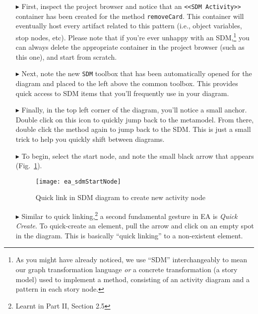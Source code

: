 \begin{itemize}
\item[$\blacktriangleright$] First, inspect the project browser and notice that an \texttt{<<SDM Activity>>} container has been created for the method
\texttt{removeCard}. This container will eventually host every artifact related to this pattern (i.e., object variables, stop nodes, etc). Please note
that if you're ever unhappy with an SDM,\footnote{As you might have already noticed, we use ``SDM'' interchangeably to mean our graph transformation
language \emph{or} a concrete transformation (a story model) used to implement a method, consisting of an activity diagram and a pattern in each story
node.} you can always delete the appropriate container in the project browser (such as this one), and start from scratch.

\item[$\blacktriangleright$] Next, note the new \texttt{SDM} toolbox that has been automatically opened for the diagram and placed to the left above
the common toolbox. This provides quick access to SDM items that you'll frequently use in your diagram.

\item[$\blacktriangleright$] Finally, in the top left corner of the diagram, you'll notice a small anchor. Double click on this icon to quickly jump back to the
metamodel. From there, double click the method again to jump back to the SDM. This is just a small trick to help you quickly shift between diagrams.

\newpage

\item[$\blacktriangleright$] To begin, select the start node, and note the small black arrow that appears (Fig.~\ref{fig:sdm_quicklink}). 

\begin{figure}[htp]
\begin{center}
  \texttt{[image: ea\_sdmStartNode]}
  \caption{Quick link in SDM diagram to create new activity node}  
  \label{fig:sdm_quicklink}
\end{center}
\end{figure}

\item[$\blacktriangleright$] Similar to quick linking,\footnote{Learnt in Part II, Section 2.5} a second fundamental gesture in EA is \emph{Quick
Create}.
To quick-create an element, pull the arrow and click on an empty spot in the diagram. This is basically ``quick linking'' to a non-existent element.


\end{itemize}
